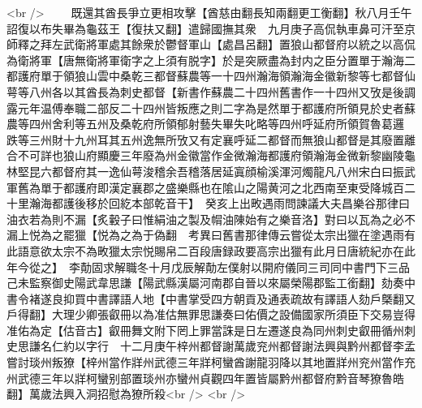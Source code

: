 <br />
　　既還其酋長爭立更相攻擊【酋慈由翻長知兩翻更工衡翻】秋八月壬午詔復以布失畢為龜茲王【復扶又翻】遣歸國撫其衆　九月庚子高侃執車鼻可汗至京師釋之拜左武衛將軍處其餘衆於鬱督軍山【處昌呂翻】置狼山都督府以統之以高侃為衛將軍【唐無衛將軍衛字之上須有脱字】於是突厥盡為封内之臣分置單于瀚海二都護府單于領狼山雲中桑乾三都督蘇農等一十四州瀚海領瀚海金徽新黎等七都督仙萼等八州各以其酋長為刺史都督【新書作蘇農二十四州舊書作一十四州又攷是後調露元年温傅奉職二部反二十四州皆叛應之則二字為是然單于都護府所領見於史者蘇農等四州舍利等五州及桑乾府所領郁射藝失畢失叱略等四州呼延府所領賀魯葛邏跌等三州財十九州耳其五州逸無所攷又有定襄呼延二都督而無狼山都督是其廢置離合不可詳也狼山府顯慶三年廢為州金徽當作金微瀚海都護府領瀚海金微新黎幽陵龜林堅昆六都督府其一逸仙萼浚稽余吾稽落居延寘顔榆溪渾河燭龍凡八州宋白曰振武軍舊為單于都護府即漢定襄郡之盛樂縣也在隂山之陽黄河之北西南至東受降城百二十里瀚海都護後移於回紇本部乾音干】　癸亥上出畋遇雨問諫議大夫昌樂谷那律曰油衣若為則不漏【炙轂子曰惟絹油之製及㡌油陳始有之樂音洛】對曰以瓦為之必不漏上悦為之罷獵【悦為之為于偽翻　考異曰舊書那律傳云嘗從太宗出獵在塗遇雨有此語意欲太宗不為畋獵太宗悦賜帛二百段唐録政要高宗出獵有此月日唐統紀亦在此年今從之】　李勣固求解職冬十月戊辰解勣左僕射以開府儀同三司同中書門下三品　己未監察御史陽武韋思謙【陽武縣漢屬河南郡自晉以來屬榮陽郡監工銜翻】劾奏中書令褚遂良抑買中書譯語人地【中書掌受四方朝貢及通表疏故有譯語人劾戶槩翻又戶得翻】大理少卿張叡冊以為准估無罪思謙奏曰佑價之設備國家所須臣下交易豈得准佑為定【估音古】叡冊舞文附下罔上罪當誅是日左遷遂良為同州刺史叡冊循州刺史思謙名仁約以字行　十二月庚午梓州都督謝萬歲兖州都督謝法興與黔州都督李孟嘗討琰州叛獠【梓州當作牂州武德三年牂柯蠻酋謝龍羽降以其地置牂州兖州當作充州武德三年以牂柯蠻别部置琰州亦蠻州貞觀四年置皆屬黔州都督府黔音琴獠魯皓翻】萬歲法興入洞招慰為獠所殺<br />
<br />

